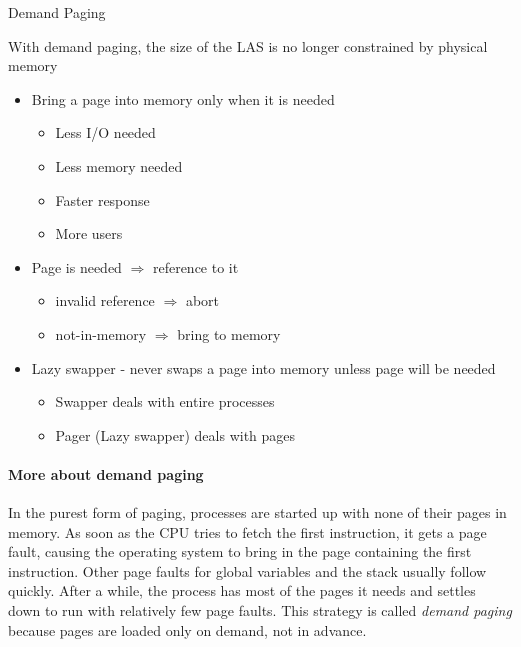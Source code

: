 \begin{frame}{Demand Paging}
  \begin{block}{With demand paging, the size of the LAS is no longer constrained by
      physical memory}
    \begin{itemize}
    \item Bring a page into memory only when it is needed
      \begin{itemize}
      \item Less I/O needed
      \item Less memory needed
      \item Faster response
      \item More users
      \end{itemize}
    \item Page is needed $\Rightarrow$ reference to it
      \begin{itemize}
      \item invalid reference $\Rightarrow$ abort
      \item not-in-memory $\Rightarrow$ bring to memory
      \end{itemize}
    \item \alert{Lazy swapper} - never swaps a page into memory unless page will
      be needed
      \begin{itemize}
      \item \alert{Swapper} deals with entire processes
      \item \alert{Pager (Lazy swapper)} deals with pages
      \end{itemize}
    \end{itemize}
  \end{block}
\end{frame}

\paragraph{More about demand paging}

In the purest form of paging, processes are started up with none of their pages in
memory. As soon as the CPU tries to fetch the first instruction, it gets a page fault,
causing the operating system to bring in the page containing the first instruction. Other
page faults for global variables and the stack usually follow quickly. After a while, the
process has most of the pages it needs and settles down to run with relatively few page
faults. This strategy is called \emph{demand paging} because pages are loaded only on
demand, not in advance.

